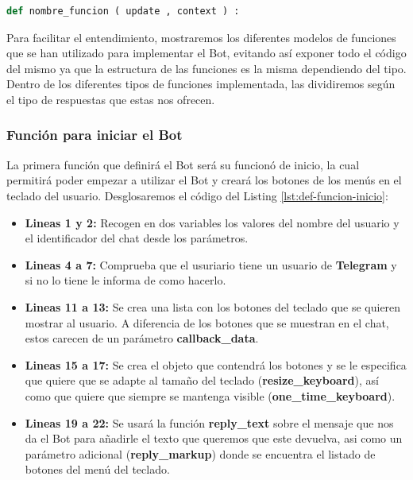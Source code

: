 
\begin{lstlisting}[language=Python, caption={Definición de un función usada por los handler.}, label={lst:def-funcion}]
def nombre_funcion ( update , context ) :
\end{lstlisting}

Para facilitar el entendimiento, mostraremos los diferentes modelos de funciones que se han utilizado para implementar el Bot, evitando así exponer todo el código del mismo ya que la estructura de las funciones es la misma dependiendo del tipo. Dentro de los diferentes tipos de funciones implementada, las dividiremos según el tipo de respuestas que estas nos ofrecen.

\subsubsection{Función para iniciar el Bot}

La primera función que definirá el Bot será su funcionó de inicio, la cual permitirá poder empezar a utilizar el Bot y creará los botones de los menús en el teclado del usuario. Desglosaremos el código del Listing \ref{lst:def-funcion-inicio}:

\begin{itemize}
	\item \textbf{Lineas 1 y 2:} Recogen en dos variables los valores del nombre del usuario y el identificador del chat desde los parámetros.
	\item \textbf{Lineas 4 a 7:} Comprueba que el usuriario tiene un usuario de \textbf{Telegram} y si no lo tiene le informa de como hacerlo.
	\item \textbf{Lineas 11 a 13:} Se crea una lista con los botones del teclado que se quieren mostrar al usuario. A diferencia de los botones que se muestran en el chat, estos carecen de un parámetro \textbf{callback\_data}.
	\item \textbf{Lineas 15 a 17:} Se crea el objeto que contendrá los botones y se le especifica que quiere que se adapte al tamaño del teclado (\textbf{resize\_keyboard}), así como que quiere que siempre se mantenga visible (\textbf{one\_time\_keyboard}).
	\item \textbf{Lineas 19 a 22:} Se usará la función \textbf{reply\_text} sobre el mensaje que nos da el Bot para añadirle el texto que queremos que este devuelva, asi como un parámetro adicional (\textbf{reply\_markup}) donde se encuentra el listado de botones del menú del teclado.
\end{itemize}

